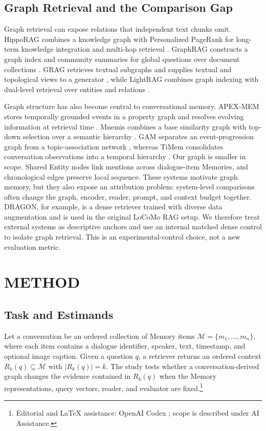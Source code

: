 \documentclass[a4paper,twoside]{article}
\newcommand{\aiedit}{\footnote{Editorial and \LaTeX{} assistance: OpenAI Codex
\cite{openai2026codex}; scope is described under AI Assistance.}}
\begin{document}
\subsection{Graph Retrieval and the Comparison Gap}

Graph retrieval can expose relations that independent text chunks omit.
HippoRAG combines a knowledge graph with Personalized PageRank for long-term
knowledge integration and multi-hop retrieval
\cite{gutierrez2024hipporag}. GraphRAG constructs a graph index and community
summaries for global questions over document collections
\cite{edge2024graphrag}. GRAG retrieves textual subgraphs and supplies textual
and topological views to a generator \cite{hu2025grag}, while LightRAG
combines graph indexing with dual-level retrieval over entities and relations
\cite{guo2025lightrag}.

Graph structure has also become central to conversational memory. APEX-MEM
stores temporally grounded events in a property graph and resolves evolving
information at retrieval time \cite{banerjee2026apexmem}. Mnemis combines a
base similarity graph with top-down selection over a semantic hierarchy
\cite{tang2026mnemis}. GAM separates an event-progression graph from a
topic-association network \cite{wu2026gam}, whereas TiMem consolidates
conversation observations into a temporal hierarchy
\cite{li2026timem}. Our graph is smaller in scope. Shared Entity nodes link
mentions across dialogue-item Memories, and chronological edges preserve local
sequence. These systems motivate graph memory, but they also expose an
attribution problem: system-level comparisons often change the graph,
encoder, reader, prompt, and context budget together. DRAGON, for example, is
a dense retriever trained with diverse data augmentation
\cite{lin2023dragon} and is used in the original LoCoMo RAG setup. We
therefore treat external systems as descriptive anchors and use an internal
matched dense control to isolate graph retrieval. This is an
experimental-control choice, not a new evaluation metric.

\section{\uppercase{Method}}

\subsection{Task and Estimands}

Let a conversation be an ordered collection of Memory items
\(\mathcal{M}=\{m_1,\ldots,m_n\}\), where each item contains a dialogue
identifier, speaker, text, timestamp, and optional image caption. Given a
question \(q\), a retriever returns an ordered context
\(R_k(q)\subseteq\mathcal{M}\) with \(|R_k(q)|=k\). The study tests whether a
conversation-derived graph changes the evidence contained in \(R_k(q)\) when
the Memory representations, query vectors, reader, and evaluator are fixed.\aiedit{}
\end{document}
